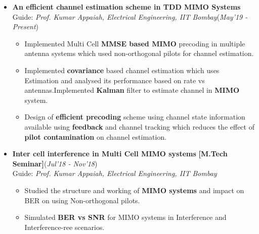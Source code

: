 \documentclass[10pt]{article}
\begin{document}

\vspace*{112pt}    %

\colorbox{bl}{}%

\begin{itemize}[leftmargin=0.4cm]


\item \textbf{An efficient channel estimation scheme in TDD MIMO Systems}\\
Guide: \textit{Prof. Kumar Appaiah, Electrical Engineering, IIT Bombay}\hfill{(\textit{May’19 - Present})}
    \begin{itemize}[leftmargin=0.5cm]
    \item Implemented Multi Cell \textbf{MMSE based MIMO }precoding in multiple antenna systems which used
non-orthogonal pilots for channel estimation.
    \item Implemented \textbf{covariance} based channel estimation which uses  Estimation and analysed its performance based on rate vs antennas.Implemented \textbf{Kalman} filter to estimate channel in \textbf{MIMO} system.
    \item  Design of \textbf{efficient precoding }scheme using channel state information available using \textbf{feedback} and channel
tracking which reduces the effect of \textbf{pilot contamination} on channel estimation.

    \end{itemize}



\item \textbf{Inter cell interference in Multi Cell MIMO systems} \textbf{[M.Tech Seminar]}\hfill{(\textit{Jul'18 - Nov'18})}\\
Guide: \textit{Prof. Kumar Appaiah, Electrical Engineering, IIT Bombay}
    \begin{itemize}[leftmargin=0.5cm]
    \item Studied the structure and working of \textbf{MIMO systems} and impact on BER on using Non-orthogonal pilots.
    \item Simulated \textbf{BER vs SNR} for MIMO systems in Interference and Interference-ree scenarios.
    \end{itemize}
    
\end{itemize}
\end{document}
